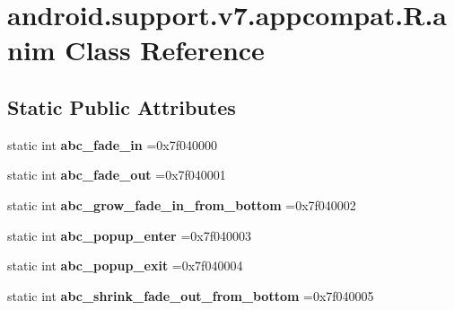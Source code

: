 \hypertarget{classandroid_1_1support_1_1v7_1_1appcompat_1_1R_1_1anim}{}\section{android.\+support.\+v7.\+appcompat.\+R.\+anim Class Reference}
\label{classandroid_1_1support_1_1v7_1_1appcompat_1_1R_1_1anim}
\subsection*{Static Public Attributes}
\begin{DoxyCompactItemize}
\item 
\mbox{\label{classandroid_1_1support_1_1v7_1_1appcompat_1_1R_1_1anim_ab1334dc8c6a8a85fa9e0154c59b583ab}} 
static int {\bfseries abc\+\_\+fade\+\_\+in} =0x7f040000
\item 
\mbox{\label{classandroid_1_1support_1_1v7_1_1appcompat_1_1R_1_1anim_a208a54acc5a9ac5845c1ac66e1176b2e}} 
static int {\bfseries abc\+\_\+fade\+\_\+out} =0x7f040001
\item 
\mbox{\label{classandroid_1_1support_1_1v7_1_1appcompat_1_1R_1_1anim_a068f0cd97e3296238d1b19534856ac0f}} 
static int {\bfseries abc\+\_\+grow\+\_\+fade\+\_\+in\+\_\+from\+\_\+bottom} =0x7f040002
\item 
\mbox{\label{classandroid_1_1support_1_1v7_1_1appcompat_1_1R_1_1anim_aa9f6056d02719a239fd6c0bdc020d23b}} 
static int {\bfseries abc\+\_\+popup\+\_\+enter} =0x7f040003
\item 
\mbox{\label{classandroid_1_1support_1_1v7_1_1appcompat_1_1R_1_1anim_a7f6e4250e26a43e6a9ef3799190939c4}} 
static int {\bfseries abc\+\_\+popup\+\_\+exit} =0x7f040004
\item 
\mbox{\label{classandroid_1_1support_1_1v7_1_1appcompat_1_1R_1_1anim_a86991f1b0828c9a700fb3a0566aa8872}} 
static int {\bfseries abc\+\_\+shrink\+\_\+fade\+\_\+out\+\_\+from\+\_\+bottom} =0x7f040005

\end{DoxyCompactItemize}
